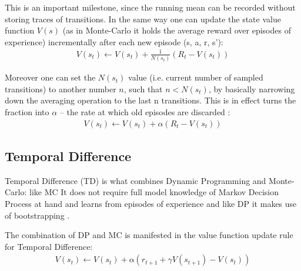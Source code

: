 This is an important milestone, since the running mean can be recorded without storing traces of transitions. In the same way one can update the state value function $V(s)$ (as in Monte-Carlo it holds the average reward over episodes of experience) incrementally after each new episode (s, a, r, s'):
\begin{align}
    V(s_t) \longleftarrow V(s_t) + \frac{1}{N(s_t)}(R_t - V(s_t))
\end{align}

Moreover one can set the $N(s_t)$ value (i.e. current number of sampled transitions) to another number $n$, such that $n < N(s_t)$, by basically narrowing down the averaging operation to the last n transitions. This is in effect turns the fraction into $\alpha$ -- the rate at which old episodes are discarded \cite{lecture_mfl}:
\begin{align}
    V(s_t) \longleftarrow V(s_t) + \alpha (R_t - V(s_t)) \label{eq:mc_increment}
\end{align}

\subsection{Temporal Difference}

Temporal Difference (TD) is what combines Dynamic Programming and Monte-Carlo: like MC It does not require full model knowledge of Markov Decision Process at hand and 
learns from episodes of experience and like DP it makes use of bootstrapping \cite{lecture_mfl}.


The combination of DP and MC is manifested in the value function update rule for Temporal Difference:
\begin{align}
  V(s_t) \longleftarrow V(s_t) + \alpha (r_{t+1} + \gamma V(s_{t+1}) - V(s_t)) \label{eq:td_update}
\end{align}


